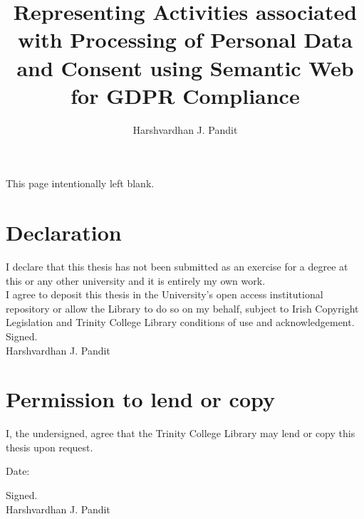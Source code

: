 \documentclass[a4paper,oneside,12pt]{book}
\title{Representing Activities associated with Processing of Personal Data and Consent using Semantic Web for GDPR Compliance}
\author{Harshvardhan J. Pandit}
\makeatletter
\def\cleardoublepage{\clearpage%
        \if@twoside
            \ifodd\c@page\else
                \vspace*{\fill}
                \hfill
                \begin{center}
                This page intentionally left blank.
                \end{center}
                \vspace{\fill}
                \thispagestyle{empty}
                \newpage
                \if@twocolumn\hbox{}\newpage\fi
            \fi
        \fi
    }
\makeatother
\begin{document}

{}


\cleardoublepage

\chapter*{Declaration}
I declare that this thesis has not been submitted as an exercise for a degree at this or any other university and it is entirely my own work. \\[1cm]
\noindent I agree to deposit this thesis in the University’s open access institutional repository or allow the Library to do so on my behalf, subject to Irish Copyright Legislation and Trinity College Library conditions of use and acknowledgement. \\[3cm]
Signed. \\
Harshvardhan J. Pandit

\chapter*{Permission to lend or copy}
I, the undersigned, agree that the Trinity College Library may lend or copy this thesis upon request.

\vspace{3cm}\noindent
Date:

\vspace{1cm}\noindent
Signed. \\
Harshvardhan J. Pandit




\tableofcontents
\listoffigures
\listoftables


\mainmatter
\renewcommand{\thepage}{\arabic{page}}
\setcounter{page}{1}










\end{document}
